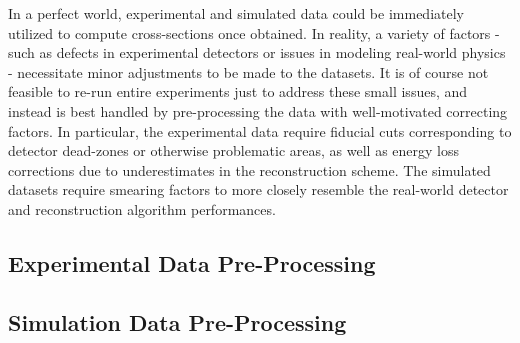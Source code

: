 
In a perfect world, experimental and simulated data could be immediately utilized to compute cross-sections once obtained. In reality, a variety of factors - such as defects in experimental detectors or issues in modeling real-world physics - necessitate minor adjustments to be made to the datasets. It is of course not feasible to re-run entire experiments just to address these small issues, and instead is best handled by pre-processing the data with well-motivated correcting factors.  In particular, the experimental data require fiducial cuts corresponding to detector dead-zones or otherwise problematic areas, as well as energy loss corrections due to underestimates in the reconstruction scheme. The simulated datasets require smearing factors to more closely resemble the real-world detector and reconstruction algorithm performances.


\subsection{Experimental Data Pre-Processing}\label{sec:momcorr}
     
     
\subsection{Simulation Data Pre-Processing}\label{sec:momsmear}
   




